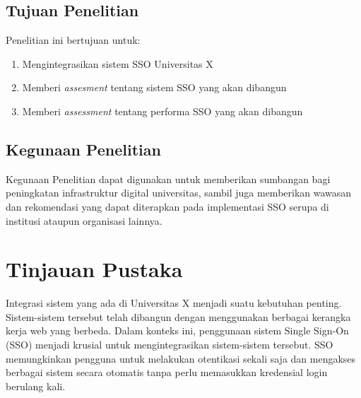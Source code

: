 \documentclass{article}
\begin{document}
\subsection{Tujuan Penelitian}
Penelitian ini bertujuan untuk:
\begin{enumerate}
    \item Mengintegrasikan sistem SSO Universitas X
    \item Memberi \emph{assesment} tentang sistem SSO yang akan dibangun
    \item Memberi \emph{assessment} tentang performa SSO yang akan dibangun
\end{enumerate}
\subsection{Kegunaan Penelitian}
Kegunaan Penelitian dapat digunakan untuk  memberikan sumbangan bagi peningkatan infrastruktur digital universitas, sambil juga memberikan wawasan dan rekomendasi yang dapat diterapkan pada implementasi SSO serupa di institusi ataupun organisasi lainnya.

\section{Tinjauan Pustaka}
Integrasi sistem yang ada di Universitas X menjadi suatu kebutuhan penting. Sistem-sistem tersebut telah dibangun dengan menggunakan berbagai kerangka kerja web yang berbeda. Dalam konteks ini, penggunaan sistem Single Sign-On (SSO) menjadi krusial untuk mengintegrasikan sistem-sistem tersebut. SSO memungkinkan pengguna untuk melakukan otentikasi sekali saja dan mengakses berbagai sistem secara otomatis tanpa perlu memasukkan kredensial login berulang kali\cite{ComparativeAnaWaluyo2022}.
\end{document}
